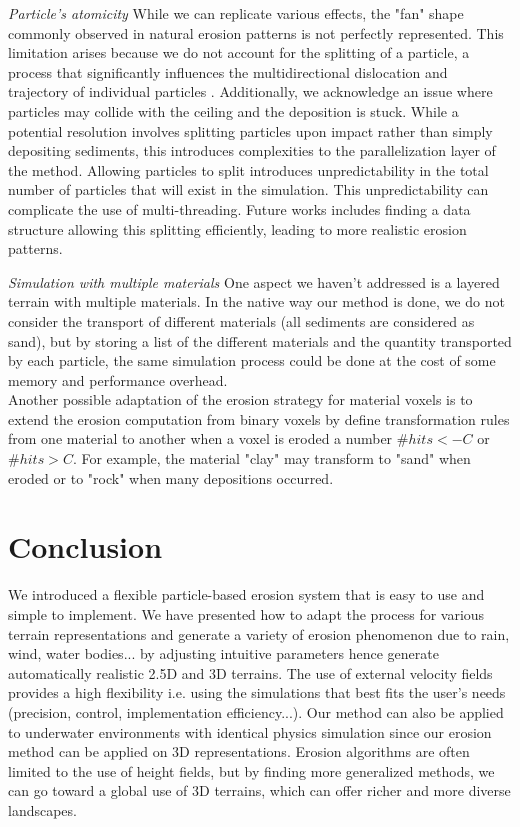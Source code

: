\textit{Particle's atomicity}
While we can replicate various effects, the "fan" shape commonly observed in natural erosion patterns is not perfectly represented. This limitation arises because we do not account for the splitting of a particle, a process that significantly influences the multidirectional dislocation and trajectory of individual particles \cite{Ranz1960}. Additionally, we acknowledge an issue where particles may collide with the ceiling and the deposition is stuck. While a potential resolution involves splitting particles upon impact rather than simply depositing sediments, this introduces complexities to the parallelization layer of the method. Allowing particles to split introduces unpredictability in the total number of particles that will exist in the simulation. This unpredictability can complicate the use of multi-threading. Future works includes finding a data structure allowing this splitting efficiently, leading to more realistic erosion patterns.

\textit{Simulation with multiple materials}
One aspect we haven't addressed is a layered terrain with multiple materials. In the native way our method is done, we do not consider the transport of different materials (all sediments are considered as sand), but by storing a list of the different materials and the quantity transported by each particle, the same simulation process could be done at the cost of some memory and performance overhead. \\
Another possible adaptation of the erosion strategy for material voxels is to extend the erosion computation from binary voxels by define transformation rules from one material to another when a voxel is eroded a number $\#hits < -C$ or $\#hits > C$. For example, the material "clay" may transform to "sand" when eroded or to "rock" when many depositions occurred. 
\section{Conclusion}
\label{sec:conclusion}
We introduced a flexible particle-based erosion system that is easy to use and simple to implement. We have presented how to adapt the process for various terrain representations and generate a variety of erosion phenomenon due to rain, wind, water bodies... by adjusting intuitive parameters hence generate automatically realistic 2.5D and 3D terrains. The use of external velocity fields provides a high flexibility i.e. using the simulations that best fits the user's needs (precision, control, implementation efficiency...). 
Our method can also be applied to underwater environments with identical physics simulation since our erosion method can be applied on 3D representations. 
Erosion algorithms are often limited to the use of height fields, but by finding more generalized methods, we can go toward a global use of 3D terrains, which can offer richer and more diverse landscapes.


